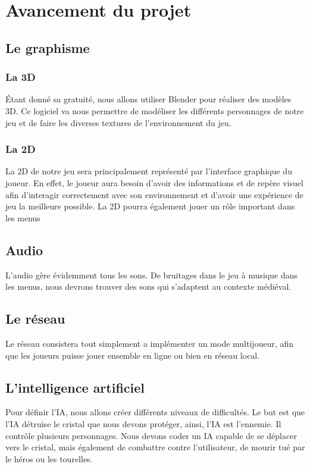 \documentclass[a4paper, 12pt]{article}
\begin{document}
\section{Avancement du projet}
	\subsection{Le graphisme}
		\subsubsection{La 3D}
		Étant donné sa gratuité, nous allons utiliser Blender pour réaliser des modèles 3D. Ce logiciel va nous permettre de modéliser les différents personnages de notre jeu et de faire les diverses textures de l’environnement du jeu.

		\subsubsection{La 2D}
		La 2D de notre jeu sera principalement représenté par l'interface graphique du joueur. En effet, le joueur aura besoin d'avoir des informations et de repère visuel afin d'interagir correctement avec son environnement et d'avoir une expérience de jeu la meilleure possible. La 2D pourra également jouer un rôle important dans les menus
	\subsection{Audio}
	L’audio gère évidemment tous les sons. De bruitages dans le jeu à musique dans les menus, nous devrons trouver des sons qui s’adaptent au contexte médiéval.

	\subsection{Le réseau}
	Le réseau consistera tout simplement a implémenter un mode multijoueur, afin que les joueurs puisse jouer ensemble en ligne ou bien en réseau local.
	\subsection{L'intelligence artificiel}
	Pour définir l’IA, nous allons créer différents niveaux de difficultés. Le but est que l’IA détruise le cristal que nous devons protéger, ainsi, l’IA est l’ennemie. Il contrôle plusieurs personnages. Nous devons coder un IA capable de se déplacer vers le cristal, mais également de combattre contre l’utilisateur, de mourir tué par le héros ou les tourelles. 
\end{document}
